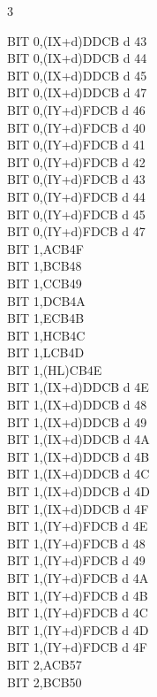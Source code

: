 \begin{multicols}{3}
{\begin{tabbing}
		BIT 0,(IX+d)\UNDOC\>DDCB d 43\\
		BIT 0,(IX+d)\UNDOC\>DDCB d 44\\
		BIT 0,(IX+d)\UNDOC\>DDCB d 45\\
		BIT 0,(IX+d)\UNDOC\>DDCB d 47\\
		BIT 0,(IY+d)\>FDCB d 46\\
		BIT 0,(IY+d)\UNDOC\>FDCB d 40\\
		BIT 0,(IY+d)\UNDOC\>FDCB d 41\\
		BIT 0,(IY+d)\UNDOC\>FDCB d 42\\
		BIT 0,(IY+d)\UNDOC\>FDCB d 43\\
		BIT 0,(IY+d)\UNDOC\>FDCB d 44\\
		BIT 0,(IY+d)\UNDOC\>FDCB d 45\\
		BIT 0,(IY+d)\UNDOC\>FDCB d 47\\
		BIT 1,A\>CB4F\\
		BIT 1,B\>CB48\\
		BIT 1,C\>CB49\\
		BIT 1,D\>CB4A\\
		BIT 1,E\>CB4B\\
		BIT 1,H\>CB4C\\
		BIT 1,L\>CB4D\\
		BIT 1,(HL)\>CB4E\\
		BIT 1,(IX+d)\>DDCB d 4E\\
		BIT 1,(IX+d)\UNDOC\>DDCB d 48\\
		BIT 1,(IX+d)\UNDOC\>DDCB d 49\\
		BIT 1,(IX+d)\UNDOC\>DDCB d 4A\\
		BIT 1,(IX+d)\UNDOC\>DDCB d 4B\\
		BIT 1,(IX+d)\UNDOC\>DDCB d 4C\\
		BIT 1,(IX+d)\UNDOC\>DDCB d 4D\\
		BIT 1,(IX+d)\UNDOC\>DDCB d 4F\\
		BIT 1,(IY+d)\>FDCB d 4E\\
		BIT 1,(IY+d)\UNDOC\>FDCB d 48\\
		BIT 1,(IY+d)\UNDOC\>FDCB d 49\\
		BIT 1,(IY+d)\UNDOC\>FDCB d 4A\\
		BIT 1,(IY+d)\UNDOC\>FDCB d 4B\\
		BIT 1,(IY+d)\UNDOC\>FDCB d 4C\\
		BIT 1,(IY+d)\UNDOC\>FDCB d 4D\\
		BIT 1,(IY+d)\UNDOC\>FDCB d 4F\\
		BIT 2,A\>CB57\\
		BIT 2,B\>CB50\\

\end{tabbing}}
\end{multicols}
